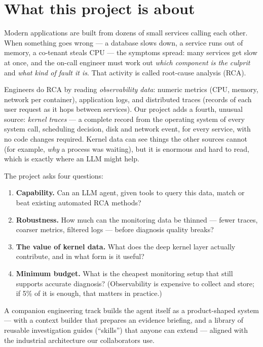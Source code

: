 \section{What this project is about}
\label{sec:project}

Modern applications are built from dozens of small services calling each other. When
something goes wrong --- a database slows down, a service runs out of memory, a
co-tenant steals CPU --- the symptoms spread: many services get slow at once, and the
on-call engineer must work out \emph{which component is the culprit} and \emph{what
kind of fault it is}. That activity is called root-cause analysis (RCA).

Engineers do RCA by reading \emph{observability data}: numeric metrics (CPU, memory,
network per container), application logs, and distributed traces (records of each
user request as it hops between services). Our project adds a fourth, unusual source:
\emph{kernel traces} --- a complete record from the operating system of every system
call, scheduling decision, disk and network event, for every service, with no code
changes required. Kernel data can see things the other sources cannot (for example,
\emph{why} a process was waiting), but it is enormous and hard to read, which is
exactly where an LLM might help.

The project asks four questions:
\begin{enumerate}
  \item \textbf{Capability.} Can an LLM agent, given tools to query this data, match
  or beat existing automated RCA methods?
  \item \textbf{Robustness.} How much can the monitoring data be thinned --- fewer
  traces, coarser metrics, filtered logs --- before diagnosis quality breaks?
  \item \textbf{The value of kernel data.} What does the deep kernel layer actually
  contribute, and in what form is it useful?
  \item \textbf{Minimum budget.} What is the cheapest monitoring setup that still
  supports accurate diagnosis? (Observability is expensive to collect and store; if
  5\% of it is enough, that matters in practice.)
\end{enumerate}

A companion engineering track builds the agent itself as a product-shaped system ---
with a context builder that prepares an evidence briefing, and a library of reusable
investigation guides (``skills'') that anyone can extend --- aligned with the
industrial architecture our collaborators use.
